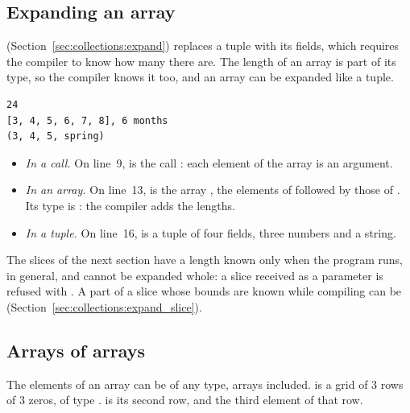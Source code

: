 \subsection{Expanding an array}
\label{sec:collections:expand_array}

 (Section~\ref{sec:collections:expand}) replaces a tuple with its
fields, which requires the compiler to know how many there are. The length of
an array is part of its type, so the compiler knows it too, and an array can be
expanded like a tuple.


\vspace{-10pt}%
\begin{lstlisting}[style=bashVerb]
24
[3, 4, 5, 6, 7, 8], 6 months
(3, 4, 5, spring)
\end{lstlisting}

\begin{itemize}
\item \textit{In a call.} On line~9,  is the call
  : each element of the array is an argument.
\item \textit{In an array.} On line~13, 
  is the array \token{[3, 4, 5, 6, 7, 8]}, the elements of 
  followed by those of . Its type is \token{[i32 ; 6]}: the
  compiler adds the lengths.
\item \textit{In a tuple.} On line~16,  is a
  tuple of four fields, three numbers and a string.
\end{itemize}

The slices of the next section have a length known only when the program runs,
in general, and cannot be expanded whole: a slice received as a parameter is
refused with . A part
of a slice whose bounds are known while compiling can be
(Section~\ref{sec:collections:expand_slice}).

\subsection{Arrays of arrays}

The elements of an array can be of any type, arrays included.
\token{[[0 ; 3] ; 3]} is a grid of 3 rows of 3 zeros, of type
\token{[[i32 ; 3] ; 3]}.  is its second row, and
 the third element of that row.

